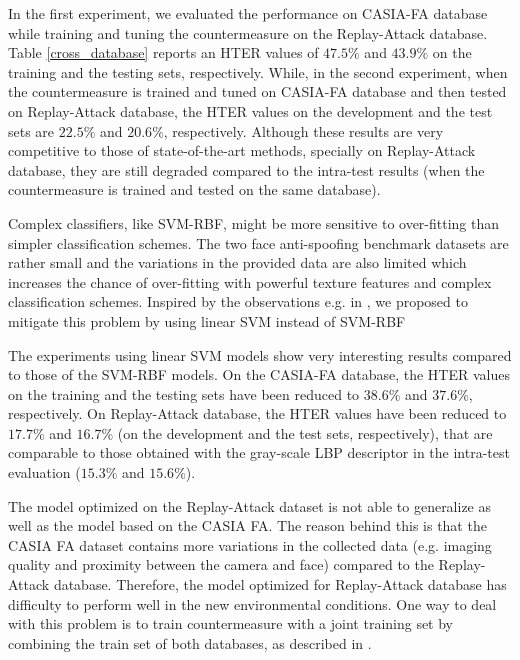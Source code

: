 \documentclass{article}
\begin{document}
In the first experiment, we evaluated the performance on  CASIA-FA database while training and tuning the countermeasure on the Replay-Attack database. Table \ref{cross_database} reports an HTER values of  $47.5 \%$ and $43.9 \%$  on the training and the testing sets, respectively. While, in the second experiment, when the  countermeasure is trained and tuned on CASIA-FA database and then tested on Replay-Attack database, the HTER values on the development and the test sets are  $22.5\%$ and $20.6\%$, respectively. Although these results are very competitive to  those of state-of-the-art methods, specially on Replay-Attack database, they are still degraded compared to the intra-test results (when the countermeasure is trained and tested on the same database).  

Complex classifiers, like SVM-RBF, might be more sensitive to over-fitting than simpler classification schemes. The two face anti-spoofing benchmark datasets are rather small and the variations in the provided data are also limited which increases the chance of over-fitting with powerful texture features and complex classification schemes. Inspired by the observations e.g. in \cite{replay} \cite{motion_lbp}, we proposed to mitigate this problem by using linear SVM instead of SVM-RBF

The experiments using linear SVM models show  very interesting  results compared to  those of the SVM-RBF models.  On the CASIA-FA database, the HTER values  on the training  and the testing  sets have been reduced to $38.6\%$ and $37.6\%$, respectively.  On Replay-Attack database, the HTER values have been reduced to $17.7\%$ and $16.7\%$ (on the development and the test sets, respectively), that are comparable to  those obtained with the gray-scale LBP descriptor in the intra-test evaluation ($15.3 \%$ and $15.6\%$). 

The model optimized on the Replay-Attack dataset is not able to generalize as well as the model based on the CASIA FA. The reason behind this is that the CASIA FA dataset contains more variations in the collected data (e.g. imaging quality and proximity between the camera and face) compared to the Replay-Attack database. Therefore, the model optimized for Replay-Attack database has difficulty to perform well in the new environmental conditions. One way to deal with this problem is to train countermeasure with a joint training set by combining the train set of both databases, as described in \cite{motion_casia}. 

	\vspace{-2mm}
\end{document}
